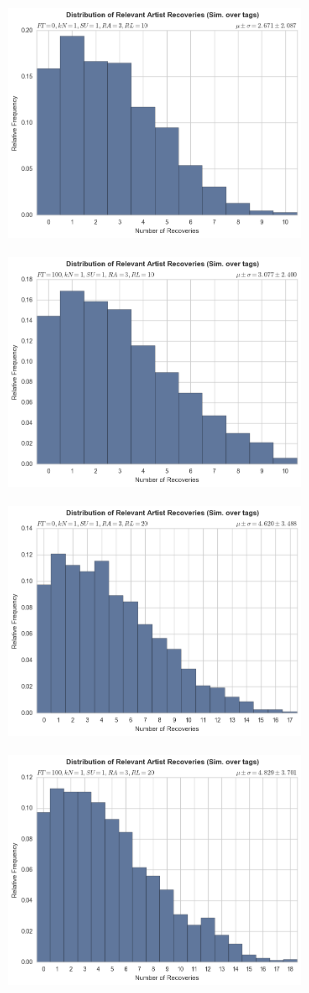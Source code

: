 \documentclass[12pt]{article}
\begin{document}
\begin{figure}[h!]
\begin{subfigure}
  \end{subfigure}
  \begin{subfigure}
      \centering
    \includegraphics[height=2.4in]{tags,FT=0,kN=1,SU=1,RA=3,RL=10.png}
  \end{subfigure}
  \begin{subfigure}
      \centering
    \includegraphics[height=2.4in]{tags,FT=100,kN=1,SU=1,RA=3,RL=10.png}
  \end{subfigure}
  \begin{subfigure}
      \centering
    \includegraphics[height=2.4in]{tags,FT=0,kN=1,SU=1,RA=3,RL=20.png}
  \end{subfigure}
  \begin{subfigure}
      \centering
    \includegraphics[height=2.4in]{tags,FT=100,kN=1,SU=1,RA=3,RL=20.png}
  \end{subfigure}
\end{figure}
\end{document}
